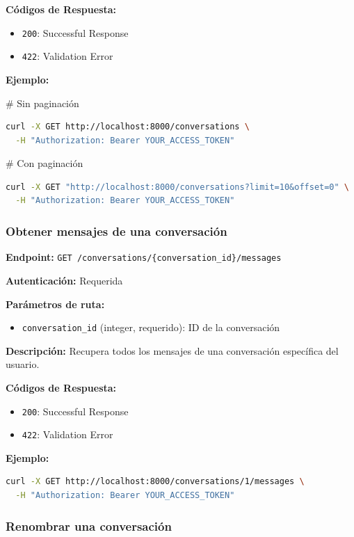 \textbf{Códigos de Respuesta:}
\begin{itemize}
    \item \texttt{200}: Successful Response
    \item \texttt{422}: Validation Error
\end{itemize}

\textbf{Ejemplo:}

\# Sin paginación
\begin{lstlisting}[language=bash]
curl -X GET http://localhost:8000/conversations \
  -H "Authorization: Bearer YOUR_ACCESS_TOKEN"
\end{lstlisting}
\# Con paginación
\begin{lstlisting}[language=bash]
curl -X GET "http://localhost:8000/conversations?limit=10&offset=0" \
  -H "Authorization: Bearer YOUR_ACCESS_TOKEN"
\end{lstlisting}

\subsubsection{Obtener mensajes de una conversación}
\label{subsubsection:A-3-Obtener mensajes de una conversación}

\textbf{Endpoint:} \texttt{GET /conversations/\{conversation\_id\}/messages}

\textbf{Autenticación:} Requerida

\textbf{Parámetros de ruta:}
\begin{itemize}
    \item \texttt{conversation\_id} (integer, requerido): ID de la conversación
\end{itemize}

\textbf{Descripción:} Recupera todos los mensajes de una conversación específica del usuario.

\textbf{Códigos de Respuesta:}
\begin{itemize}
    \item \texttt{200}: Successful Response
    \item \texttt{422}: Validation Error
\end{itemize}

\textbf{Ejemplo:}

\begin{lstlisting}[language=bash]
curl -X GET http://localhost:8000/conversations/1/messages \
  -H "Authorization: Bearer YOUR_ACCESS_TOKEN"
\end{lstlisting}

\subsubsection{Renombrar una conversación}
\label{subsubsection:A-3-Renombrar una conversación}

